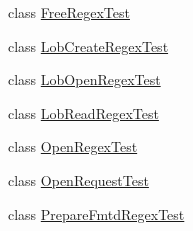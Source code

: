 \begin{DoxyCompactItemize}
class \hyperlink{classclang_1_1tidy_1_1pagesjaunes_1_1test_1_1_free_regex_test}{Free\+Regex\+Test}
\item 
class \hyperlink{classclang_1_1tidy_1_1pagesjaunes_1_1test_1_1_lob_create_regex_test}{Lob\+Create\+Regex\+Test}
\item 
class \hyperlink{classclang_1_1tidy_1_1pagesjaunes_1_1test_1_1_lob_open_regex_test}{Lob\+Open\+Regex\+Test}
\item 
class \hyperlink{classclang_1_1tidy_1_1pagesjaunes_1_1test_1_1_lob_read_regex_test}{Lob\+Read\+Regex\+Test}
\item 
class \hyperlink{classclang_1_1tidy_1_1pagesjaunes_1_1test_1_1_open_regex_test}{Open\+Regex\+Test}
\item 
class \hyperlink{classclang_1_1tidy_1_1pagesjaunes_1_1test_1_1_open_request_test}{Open\+Request\+Test}
\item 
class \hyperlink{classclang_1_1tidy_1_1pagesjaunes_1_1test_1_1_prepare_fmtd_regex_test}{Prepare\+Fmtd\+Regex\+Test}
\end{DoxyCompactItemize}
